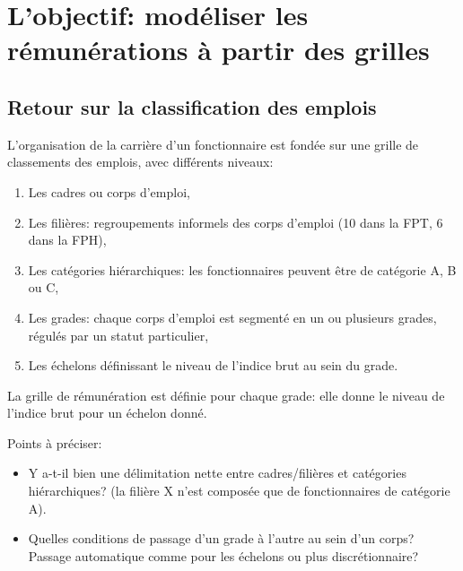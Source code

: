 \documentclass[11pt,a4paper]{article}
\begin{document}
\else \fi



\section{L'objectif: modéliser les rémunérations à partir des grilles}


\subsection*{Retour sur la classification des emplois}

L'organisation de la carrière d'un fonctionnaire est fondée sur une grille de classements des emplois, avec différents niveaux:
 
\begin{enumerate}[leftmargin=2cm ,parsep=0cm,itemsep=0cm,topsep=0cm] 
\item Les cadres ou corps d'emploi,
\item Les filières: regroupements informels des corps d'emploi (10 dans la FPT, 6 dans la FPH), 
\item Les catégories hiérarchiques: les fonctionnaires peuvent être de catégorie A, B ou C,
\item Les grades: chaque corps d'emploi est segmenté en un ou plusieurs grades, régulés par un statut particulier,
\item Les échelons définissant le niveau de l'indice brut au sein du grade. 
\end{enumerate}

\vspace{0.5cm}

La grille de rémunération est définie pour chaque grade: elle donne le niveau de l'indice brut pour un échelon donné. 


Points à préciser: 
\begin{itemize}[leftmargin=1cm ,parsep=0cm,itemsep=0cm,topsep=0cm] 
\item Y a-t-il bien une délimitation nette entre cadres/filières et catégories hiérarchiques? (la filière X n'est composée que de fonctionnaires de catégorie A). 
\item Quelles conditions de passage d'un grade à l'autre au sein d'un corps? Passage automatique comme pour les échelons ou plus discrétionnaire? %
\end{itemize}
\end{document}
